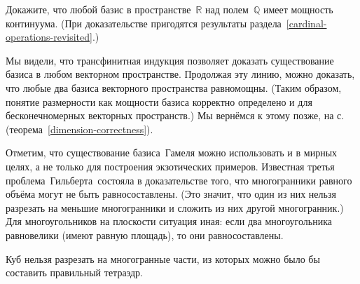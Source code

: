 \begin{problem}
Докажите, что любой базис в пространстве~$\mathbb{R}$ над
полем~$\mathbb{Q}$ имеет мощность континуума. (При доказательстве
пригодятся результаты раздела~\ref{cardinal-operations-revisited}.)
\end{problem}

\problskip
Мы видели, что трансфинитная индукция позволяет доказать
существование базиса в любом векторном пространстве. Продолжая
эту линию, можно доказать, что любые два базиса векторного
пространства равномощны. (Таким образом, понятие размерности как
мощности базиса корректно определено и для бесконечномерных
векторных пространств.) Мы вернёмся к этому позже, на
с.~\pageref{dimension-correctness}
(теорема~\ref{dimension-correctness}).

Отметим, что существование базиса~Гамеля можно использовать и
 в мирных целях, а не только для построения экзотических
примеров. Известная  третья проблема~Гильберта\ состояла в
доказательстве того, что многогранники равного объёма могут не
быть равносоставлены. (Это значит,
что один из них нельзя
разрезать на меньшие многогранники и сложить из них другой
многогранник.) Для многоугольников на плоскости ситуация иная:
если два многоугольника равновелики (имеют равную площадь),
то они равносоставлены.

\begin{theorem}
Куб нельзя разрезать на многогранные части, из которых можно было бы составить правильный тетраэдр.
\end{theorem}


